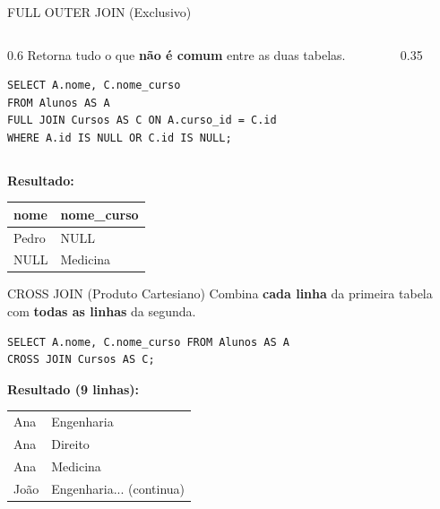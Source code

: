 \documentclass[10pt]{beamer}
\begin{document}
\begin{frame}[fragile]{FULL OUTER JOIN (Exclusivo)}
    \begin{columns}
        \begin{column}{0.6\textwidth}
            Retorna tudo o que \textbf{não é comum} entre as duas tabelas.
            \begin{lstlisting}
SELECT A.nome, C.nome_curso
FROM Alunos AS A
FULL JOIN Cursos AS C ON A.curso_id = C.id
WHERE A.id IS NULL OR C.id IS NULL;
            \end{lstlisting}
        \end{column}
        \begin{column}{0.35\textwidth}
            \centering
        \end{column}
    \end{columns}
    \textbf{Resultado:}
    \small
    \begin{table}
        \begin{tabular}{ll}
        \toprule
        \textbf{nome} & \textbf{nome\_curso} \\ \midrule
        \alert{Pedro} & \alert{NULL} \\
        \alert{NULL} & \alert{Medicina} \\ \bottomrule
        \end{tabular}
    \end{table}
\end{frame}

\begin{frame}[fragile]{CROSS JOIN (Produto Cartesiano)}
    Combina \textbf{cada linha} da primeira tabela com \textbf{todas as linhas} da segunda.
    \begin{lstlisting}
SELECT A.nome, C.nome_curso FROM Alunos AS A
CROSS JOIN Cursos AS C;
    \end{lstlisting}
    \textbf{Resultado (9 linhas):}
    \small
    \begin{center}
    \begin{tabular}{ll}
    \toprule
    Ana & Engenharia \\
    Ana & Direito \\
    Ana & Medicina \\
    João & Engenharia... (continua) \\ \bottomrule
    \end{tabular}
    \end{center}
\end{frame}
\end{document}
